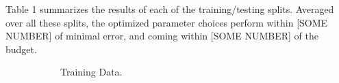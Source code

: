 Table 1 summarizes the results of each of the training/testing splits. Averaged over all these splits, the optimized parameter choices perform within [SOME NUMBER] of minimal error, and coming within [SOME NUMBER] of the budget.

\begin{figure}
	\begin{subfigure}[b]{.45\textwidth}
\begin{center}
		\caption{Training Data.}
\end{center}
	\end{subfigure}
\hspace{1cm}
	\begin{subfigure}[b]{.45\textwidth}
\begin{center}

\end{center}
\end{subfigure}
\end{figure}
